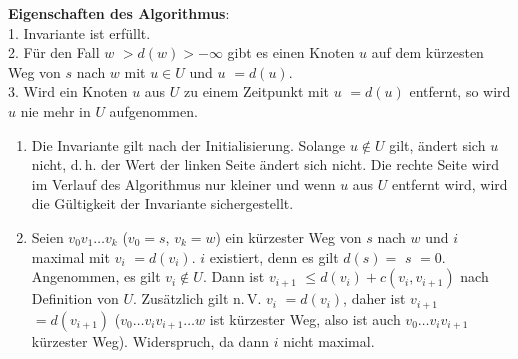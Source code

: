 \linie

\textbf{Eigenschaften des Algorithmus}: \\
1. Invariante ist erfüllt. \\
2. Für den Fall \code{dist[}$w$\code{]} $> d(w) > -\infty$ gibt es einen
Knoten $u$ auf dem kürzesten Weg von $s$ nach $w$ mit
$u \in U$ und \code{dist[}$u$\code{]} $= d(u)$. \\
3. Wird ein Knoten $u$ aus $U$ zu einem Zeitpunkt mit
\code{dist[}$u$\code{]} $= d(u)$ entfernt, so wird $u$ nie mehr in
$U$ aufgenommen.

\begin{Beweis}
    \begin{enumerate}
        \item
        Die Invariante gilt nach der Initialisierung.
        Solange $u \notin U$ gilt, ändert sich \code{dist[}$u$\code{]}
        nicht, d.\,h. der Wert der linken Seite ändert sich nicht.
        Die rechte Seite wird im Verlauf des Algorithmus nur kleiner
        und wenn $u$ aus $U$ entfernt wird, wird die Gültigkeit der
        Invariante sichergestellt.

        \item
        Seien $v_0 v_1 \dotsc v_k$ ($v_0 = s$, $v_k = w$) ein kürzester Weg
        von $s$ nach $w$ und $i$ maximal mit
        \code{dist[}$v_i$\code{]} $= d(v_i)$.
        $i$ existiert, denn es gilt $d(s) =$ \code{dist[}$s$\code{]} $= 0$.
        Angenommen, es gilt $v_i \notin U$.
        Dann ist \code{dist[}$v_{i+1}$\code{]} $\le d(v_i) + c(v_i, v_{i+1})$
        nach Definition von $U$.
        Zusätzlich gilt n.\,V. \code{dist[}$v_i$\code{]} $= d(v_i)$, daher
        ist \code{dist[}$v_{i+1}$\code{]} $= d(v_{i+1})$
        ($v_0 \dotsc v_i v_{i+1} \dotsc w$ ist kürzester Weg, also ist auch
        $v_0 \dotsc v_i v_{i+1}$ kürzester Weg).
        Widerspruch, da dann $i$ nicht maximal.
    \end{enumerate}
\end{Beweis}

\linie
\pagebreak


